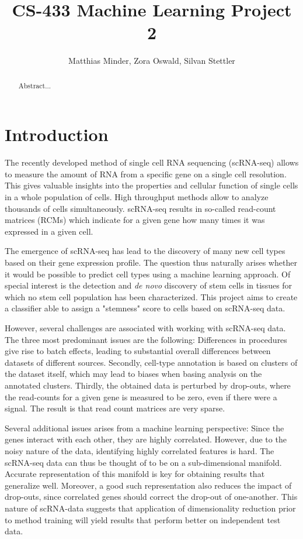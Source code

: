 \documentclass[10pt,conference,compsocconf]{IEEEtran}
\begin{document}
\title{CS-433 Machine Learning Project 2}

\author{
  Matthias Minder, Zora Oswald, Silvan Stettler\\
}

\maketitle

\begin{abstract}
Abstract...
\end{abstract}

\section*{Introduction} 
The recently developed method of single cell RNA sequencing (scRNA-seq) allows to measure the amount of RNA from a specific gene on a single cell resolution. This gives valuable insights into the properties and cellular function of single cells in a whole population of cells. High throughput methods allow to analyze thousands of cells simultaneously. scRNA-seq results in so-called read-count matrices (RCMs) which indicate for a given gene how many times it was expressed in a given cell.
\par 
The emergence of scRNA-seq has lead to the discovery of many new cell types based on their gene expression profile. The question thus naturally arises whether it would be possible to predict cell types using a machine learning approach. Of special interest is the detection and \textit{de novo} discovery of stem cells in tissues for which no stem cell population has been characterized. This project aims to create a classifier able to assign a "stemness" score to cells based on scRNA-seq data. 
\par
However, several challenges are associated with working with scRNA-seq data. The three most predominant issues are the following: Differences in procedures give rise to batch effects, leading to substantial overall differences between datasets of different sources. Secondly, cell-type annotation is based on clusters of the dataset itself, which may lead to biases when basing analysis on the annotated clusters. Thirdly, the obtained data is perturbed by drop-outs, where the read-counts for a given gene is measured to be zero, even if there were a signal. The result is that read count matrices are very sparse. 
\par
Several additional issues arises from a machine learning perspective: Since the genes interact with each other, they are highly correlated. However, due to the noisy nature of the data, identifying highly correlated features is hard. The scRNA-seq data can thus be thought of to be on a sub-dimensional manifold. Accurate representation of this manifold is key for obtaining results that generalize well. Moreover, a good such representation also reduces the impact of drop-outs, since correlated genes should correct the drop-out of one-another. This nature of scRNA-data suggests that application of dimensionality reduction prior to method training will yield results that perform better on independent test data. 
\end{document}
